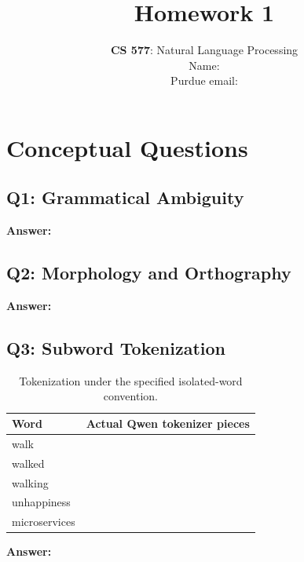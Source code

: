 \documentclass[11pt,a4paper]{article}
\title{\textbf{Homework 1}}
\author{\textbf{CS 577}: Natural Language Processing\\[0.3cm]
Name: \underline{\hspace{5cm}}\\[0.15cm]
Purdue email: \underline{\hspace{4cm}}}
\date{}
\newcommand{\answer}{\par\noindent\textbf{Answer:}\par\vspace{0.5cm}}
\newcommand{\blankrow}{\rule{0pt}{0.55cm}}
\begin{document}
\maketitle

\section{Conceptual Questions}
\subsection*{Q1: Grammatical Ambiguity}
\answer

\subsection*{Q2: Morphology and Orthography}
\answer

\subsection*{Q3: Subword Tokenization}
\begin{table}[H]
\centering\small
\begin{tabularx}{\linewidth}{@{}P{4cm}L@{}}\toprule
\textbf{Word}&\textbf{Actual Qwen tokenizer pieces}\\\midrule
walk&\blankrow\\\addlinespace[2pt]
walked&\blankrow\\\addlinespace[2pt]
walking&\blankrow\\\addlinespace[2pt]
unhappiness&\blankrow\\\addlinespace[2pt]
microservices&\blankrow\\\bottomrule
\end{tabularx}
\caption{Tokenization under the specified isolated-word convention.}
\label{tab:tokenization}
\end{table}
\answer

\clearpage
\end{document}
